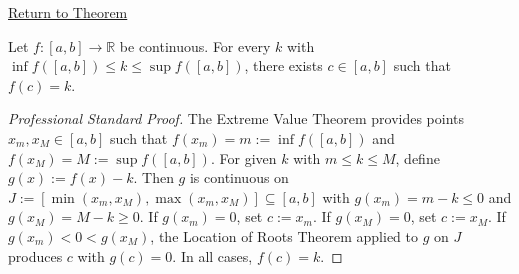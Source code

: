 \newpage
{}
\label{prf:ivt-between-inf-and-sup}

\begin{remark*}[Return]
\hyperref[cor:ivt-between-inf-and-sup]{Return to Theorem}
\end{remark*}

\begin{theorem*}
Let $f : [a,b] \to \mathbb{R}$ be continuous. For every $k$ with $\inf f([a,b]) \leq k \leq \sup f([a,b])$, there exists $c \in [a,b]$ such that $f(c) = k$.
\end{theorem*}

\begin{proof}[Professional Standard Proof]
\LRAProofBodyStart
The Extreme Value Theorem provides points $x_m, x_M \in [a,b]$ such that $f(x_m) = m := \inf f([a,b])$ and $f(x_M) = M := \sup f([a,b])$. For given $k$ with $m \leq k \leq M$, define $g(x) := f(x) - k$. Then $g$ is continuous on $J := [\min(x_m, x_M), \max(x_m, x_M)] \subseteq [a,b]$ with $g(x_m) = m - k \leq 0$ and $g(x_M) = M - k \geq 0$. If $g(x_m) = 0$, set $c := x_m$. If $g(x_M) = 0$, set $c := x_M$. If $g(x_m) < 0 < g(x_M)$, the Location of Roots Theorem applied to $g$ on $J$ produces $c$ with $g(c) = 0$. In all cases, $f(c) = k$.
\end{proof}

